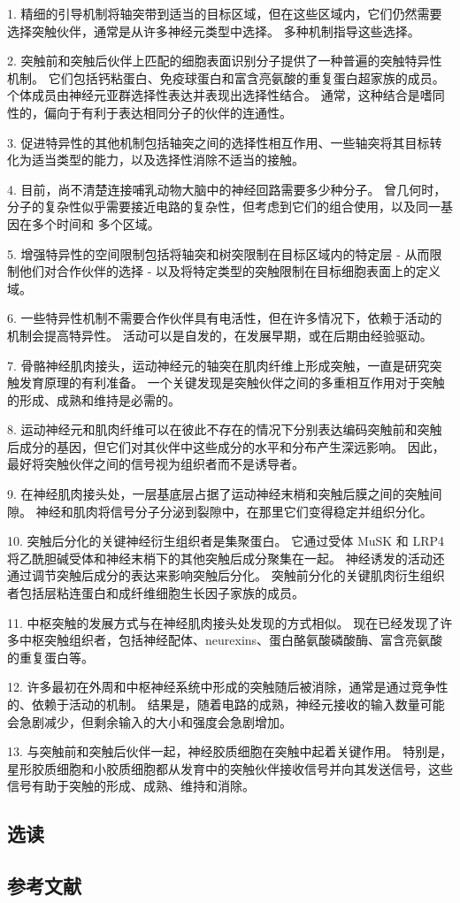 1. 精细的引导机制将轴突带到适当的目标区域，但在这些区域内，它们仍然需要选择突触伙伴，通常是从许多神经元类型中选择。 多种机制指导这些选择。 

2. 突触前和突触后伙伴上匹配的细胞表面识别分子提供了一种普遍的突触特异性机制。 它们包括钙粘蛋白、免疫球蛋白和富含亮氨酸的重复蛋白超家族的成员。 个体成员由神经元亚群选择性表达并表现出选择性结合。 通常，这种结合是嗜同性的，偏向于有利于表达相同分子的伙伴的连通性。 

3. 促进特异性的其他机制包括轴突之间的选择性相互作用、一些轴突将其目标转化为适当类型的能力，以及选择性消除不适当的接触。 

4. 目前，尚不清楚连接哺乳动物大脑中的神经回路需要多少种分子。 曾几何时，分子的复杂性似乎需要接近电路的复杂性，但考虑到它们的组合使用，以及同一基因在多个时间和 多个区域。

5. 增强特异性的空间限制包括将轴突和树突限制在目标区域内的特定层 - 从而限制他们对合作伙伴的选择 - 以及将特定类型的突触限制在目标细胞表面上的定义域。 

6. 一些特异性机制不需要合作伙伴具有电活性，但在许多情况下，依赖于活动的机制会提高特异性。 活动可以是自发的，在发展早期，或在后期由经验驱动。 

7. 骨骼神经肌肉接头，运动神经元的轴突在肌肉纤维上形成突触，一直是研究突触发育原理的有利准备。 一个关键发现是突触伙伴之间的多重相互作用对于突触的形成、成熟和维持是必需的。 

8. 运动神经元和肌肉纤维可以在彼此不存在的情况下分别表达编码突触前和突触后成分的基因，但它们对其伙伴中这些成分的水平和分布产生深远影响。 因此，最好将突触伙伴之间的信号视为组织者而不是诱导者。 

9. 在神经肌肉接头处，一层基底层占据了运动神经末梢和突触后膜之间的突触间隙。 神经和肌肉将信号分子分泌到裂隙中，在那里它们变得稳定并组织分化。 

10. 突触后分化的关键神经衍生组织者是集聚蛋白。 它通过受体 MuSK 和 LRP4 将乙酰胆碱受体和神经末梢下的其他突触后成分聚集在一起。 神经诱发的活动还通过调节突触后成分的表达来影响突触后分化。 突触前分化的关键肌肉衍生组织者包括层粘连蛋白和成纤维细胞生长因子家族的成员。 

11. 中枢突触的发展方式与在神经肌肉接头处发现的方式相似。 现在已经发现了许多中枢突触组织者，包括神经配体、neurexins、蛋白酪氨酸磷酸酶、富含亮氨酸的重复蛋白等。 

12. 许多最初在外周和中枢神经系统中形成的突触随后被消除，通常是通过竞争性的、依赖于活动的机制。 结果是，随着电路的成熟，神经元接收的输入数量可能会急剧减少，但剩余输入的大小和强度会急剧增加。 

13. 与突触前和突触后伙伴一起，神经胶质细胞在突触中起着关键作用。 特别是，星形胶质细胞和小胶质细胞都从发育中的突触伙伴接收信号并向其发送信号，这些信号有助于突触的形成、成熟、维持和消除。


\subsection{选读}
\subsection{参考文献}